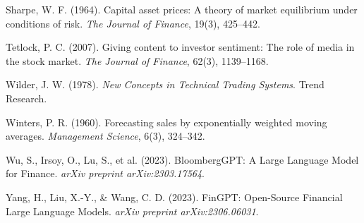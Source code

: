 \documentclass[12pt, a4paper, oneside]{report}
\begin{document}
\begin{enumerate}[label={[\arabic*]}, nosep, leftmargin=*, itemsep=4pt]
\item Sharpe, W. F. (1964). Capital asset prices: A theory of market equilibrium under conditions of risk. \textit{The Journal of Finance}, 19(3), 425--442.

\item Tetlock, P. C. (2007). Giving content to investor sentiment: The role of media in the stock market. \textit{The Journal of Finance}, 62(3), 1139--1168.

\item Wilder, J. W. (1978). \textit{New Concepts in Technical Trading Systems}. Trend Research.

\item Winters, P. R. (1960). Forecasting sales by exponentially weighted moving averages. \textit{Management Science}, 6(3), 324--342.

\item Wu, S., Irsoy, O., Lu, S., et al. (2023). BloombergGPT: A Large Language Model for Finance. \textit{arXiv preprint arXiv:2303.17564}.

\item Yang, H., Liu, X.-Y., \& Wang, C. D. (2023). FinGPT: Open-Source Financial Large Language Models. \textit{arXiv preprint arXiv:2306.06031}.

\end{enumerate}
\end{document}
